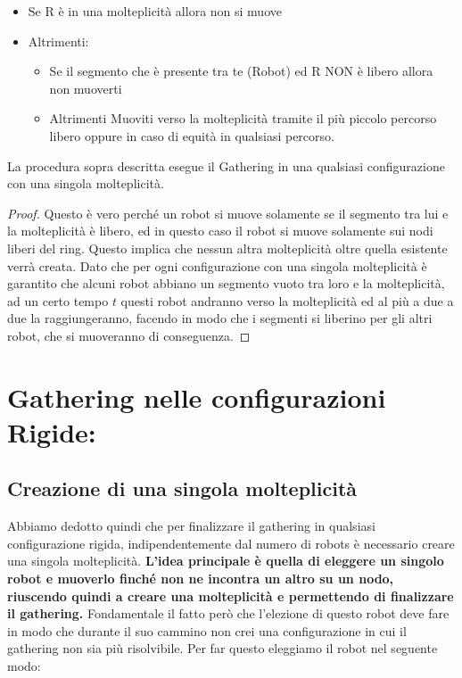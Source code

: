\begin{itemize}
    \item Se R è in una molteplicità allora non si muove
    \item Altrimenti:
          \begin{itemize}
              \item Se il segmento che è presente tra te (Robot) ed R NON è libero
                    allora non muoverti
              \item Altrimenti Muoviti verso la molteplicità tramite il più piccolo
                    percorso libero oppure in caso di equità in qualsiasi percorso.
          \end{itemize}
\end{itemize}

\begin{lemma}
    La procedura sopra descritta esegue il Gathering in una
    qualsiasi configurazione con una singola molteplicità.
\end{lemma}

\begin{proof}
    Questo è vero perché un robot si muove solamente se il segmento
    tra lui e la molteplicità è libero, ed in questo caso il robot si muove
    solamente sui nodi liberi del ring. Questo implica che nessun altra molteplicità
    oltre quella esistente verrà creata. Dato che per ogni configurazione con una
    singola molteplicità è garantito che alcuni robot abbiano un segmento vuoto tra
    loro e la molteplicità, ad un certo tempo $t$ questi robot andranno verso la
    molteplicità ed al più a due a due la raggiungeranno, facendo in modo che i
    segmenti si liberino per gli altri robot, che si muoveranno di conseguenza.
\end{proof}

\section{Gathering nelle configurazioni Rigide:}
\subsection{Creazione di una singola molteplicità}
Abbiamo dedotto quindi che per finalizzare il gathering in qualsiasi
configurazione rigida, indipendentemente dal numero di robots è necessario
creare una singola molteplicità. \textbf{L'idea principale è quella di eleggere
    un singolo robot e muoverlo finché non ne incontra un altro su un nodo,
    riuscendo quindi a creare una molteplicità e permettendo di finalizzare il
    gathering.} Fondamentale il fatto però che l'elezione di questo robot deve fare
in modo che durante il suo cammino non crei una configurazione in cui il
gathering non sia più risolvibile. Per far questo eleggiamo il robot nel
seguente modo:\\

